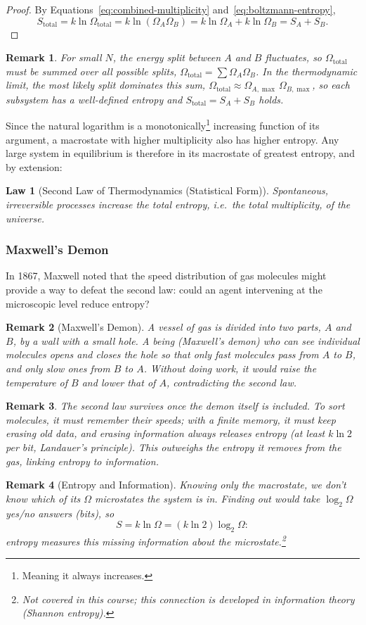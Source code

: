 \documentclass{article}
\newtheorem{law}{Law}
\newtheorem{remark}{Remark}
\begin{document}
\begin{proof}
    By Equations~\eqref{eq:combined-multiplicity} and~\eqref{eq:boltzmann-entropy},
    \[S_{\text{total}} = k\ln\Omega_{\text{total}} = k\ln(\Omega_A\Omega_B) = k\ln\Omega_A + k\ln\Omega_B = S_A + S_B.\]
\end{proof}
\begin{remark}
    For small $N$, the energy split between $A$ and $B$ fluctuates, so $\Omega_{\text{total}}$ must be summed over all possible splits, $\Omega_{\text{total}} = \sum \Omega_A\Omega_B$. In the thermodynamic limit, the most likely split dominates this sum, $\Omega_{\text{total}} \approx \Omega_{A,\max}\,\Omega_{B,\max}$, so each subsystem has a well-defined entropy and $S_{\text{total}} = S_A + S_B$ holds.
\end{remark}
Since the natural logarithm is a monotonically\footnote{Meaning it always increases.} increasing function of its argument, a macrostate with higher multiplicity also has higher entropy. Any large system in equilibrium is therefore in its macrostate of greatest entropy, and by extension:
\begin{law}[Second Law of Thermodynamics (Statistical Form)]
    Spontaneous, irreversible processes increase the total entropy, i.e.\ the total multiplicity, of the universe.
\end{law}

\subsubsection{Maxwell's Demon}
In 1867, Maxwell noted that the speed distribution of gas molecules might provide a way to defeat the second law: could an agent intervening at the microscopic level reduce entropy?
\begin{remark}[Maxwell's Demon]
    A vessel of gas is divided into two parts, $A$ and $B$, by a wall with a small hole. A being (Maxwell's demon) who can see individual molecules opens and closes the hole so that only fast molecules pass from $A$ to $B$, and only slow ones from $B$ to $A$. Without doing work, it would raise the temperature of $B$ and lower that of $A$, contradicting the second law.
\end{remark}
\begin{remark}
    The second law survives once the demon itself is included. To sort molecules, it must remember their speeds; with a finite memory, it must keep erasing old data, and erasing information always releases entropy (at least $k\ln 2$ per bit, Landauer's principle). This outweighs the entropy it removes from the gas, linking entropy to information.
\end{remark}
\begin{remark}[Entropy and Information]
    Knowing only the macrostate, we don't know which of its $\Omega$ microstates the system is in. Finding out would take $\log_2\Omega$ yes/no answers (bits), so
    \[S = k\ln\Omega = (k\ln 2)\log_2\Omega:\]
    entropy measures this missing information about the microstate.\footnote{Not covered in this course; this connection is developed in information theory (Shannon entropy).}
\end{remark}
\end{document}
